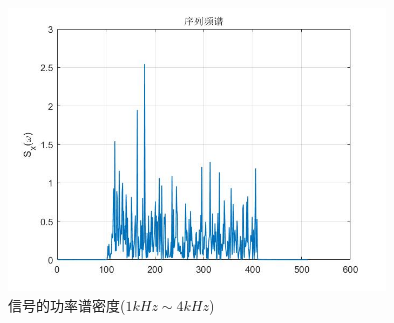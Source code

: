 \documentclass[UTF-8, a4paper, 12pt]{ctexart}
\begin{document}
\begin{figure}[htbp]
    \centering
    \includegraphics[width=10cm]{figs/f1_4.jpg}
    \caption{信号的功率谱密度($1kHz\sim 4kHz$)}
\end{figure}
\end{document}
